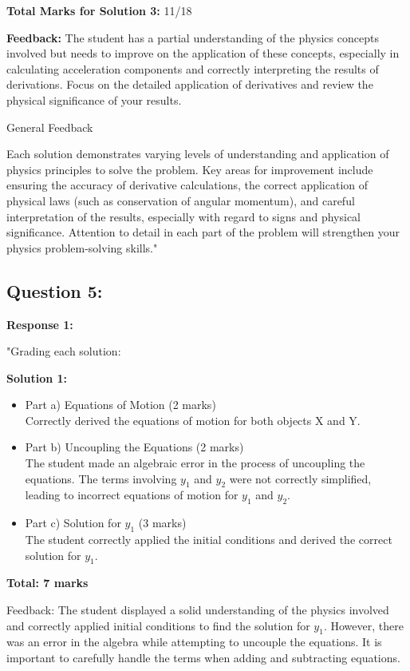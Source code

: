 \documentclass[a4paper,11pt]{article}
\begin{document}
\textbf{Total Marks for Solution 3:} 11/18

\textbf{Feedback:} The student has a partial understanding of the physics concepts involved but needs to improve on the application of these concepts, especially in calculating acceleration components and correctly interpreting the results of derivations. Focus on the detailed application of derivatives and review the physical significance of your results.

General Feedback

Each solution demonstrates varying levels of understanding and application of physics principles to solve the problem. Key areas for improvement include ensuring the accuracy of derivative calculations, the correct application of physical laws (such as conservation of angular momentum), and careful interpretation of the results, especially with regard to signs and physical significance. Attention to detail in each part of the problem will strengthen your physics problem-solving skills."

\subsection*{Question 5:}

\textbf{Response 1:}

"Grading each solution:

\textbf{Solution 1:}

\begin{itemize}
    \item Part a) Equations of Motion (2 marks) \\
    Correctly derived the equations of motion for both objects X and Y.
    \item Part b) Uncoupling the Equations (2 marks) \\
    The student made an algebraic error in the process of uncoupling the equations. The terms involving \(y_1\) and \(y_2\) were not correctly simplified, leading to incorrect equations of motion for \(y_1\) and \(y_2\).
    \item Part c) Solution for \(y_1\) (3 marks) \\
    The student correctly applied the initial conditions and derived the correct solution for \(y_1\).
\end{itemize}

\textbf{Total: 7 marks}

Feedback: The student displayed a solid understanding of the physics involved and correctly applied initial conditions to find the solution for \(y_1\). However, there was an error in the algebra while attempting to uncouple the equations. It is important to carefully handle the terms when adding and subtracting equations.
\end{document}
